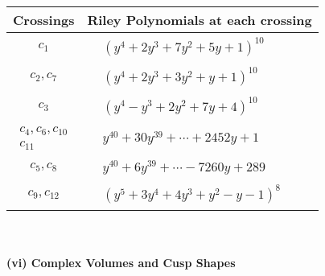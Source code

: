 \documentclass[1p]{elsarticle_modified}
\theoremstyle{definition}
\begin{document}
\begin{tabular}{m{50pt}|m{274pt}}
Crossings & \hspace{64pt}Riley Polynomials at each crossing \\
\hline $$\begin{aligned}c_{1}\end{aligned}$$&$\begin{aligned}
&(y^4+2 y^3+7 y^2+5 y+1)^{10}
\end{aligned}$\\
\hline $$\begin{aligned}c_{2},c_{7}\end{aligned}$$&$\begin{aligned}
&(y^4+2 y^3+3 y^2+y+1)^{10}
\end{aligned}$\\
\hline $$\begin{aligned}c_{3}\end{aligned}$$&$\begin{aligned}
&(y^4- y^3+2 y^2+7 y+4)^{10}
\end{aligned}$\\
\hline $$\begin{aligned}c_{4},c_{6},c_{10}\\c_{11}\end{aligned}$$&$\begin{aligned}
&y^{40}+30 y^{39}+\cdots+2452 y+1
\end{aligned}$\\
\hline $$\begin{aligned}c_{5},c_{8}\end{aligned}$$&$\begin{aligned}
&y^{40}+6 y^{39}+\cdots-7260 y+289
\end{aligned}$\\
\hline $$\begin{aligned}c_{9},c_{12}\end{aligned}$$&$\begin{aligned}
&(y^5+3 y^4+4 y^3+y^2- y-1)^8
\end{aligned}$\\
\hline
\end{tabular}\\~\\
\newpage\flushleft \textbf{(vi) Complex Volumes and Cusp Shapes}
\end{document}
